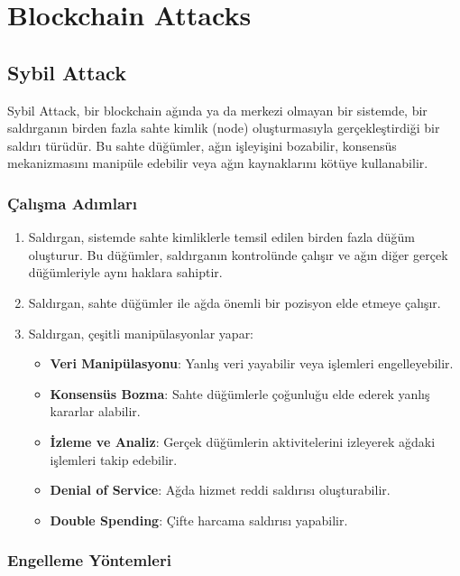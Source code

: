 \section{Blockchain Attacks}

\subsection{Sybil Attack}

Sybil Attack, bir blockchain ağında ya da merkezi olmayan bir sistemde, bir saldırganın birden fazla sahte kimlik (node) oluşturmasıyla gerçekleştirdiği bir saldırı türüdür. Bu sahte düğümler, ağın işleyişini bozabilir, konsensüs mekanizmasını manipüle edebilir veya ağın kaynaklarını kötüye kullanabilir.

\subsubsection{Çalışma Adımları}

\begin{enumerate}
    \item Saldırgan, sistemde sahte kimliklerle temsil edilen birden fazla düğüm oluşturur. Bu düğümler, saldırganın kontrolünde çalışır ve ağın diğer gerçek düğümleriyle aynı haklara sahiptir.
    \item Saldırgan, sahte düğümler ile ağda önemli bir pozisyon elde etmeye çalışır.
    \item Saldırgan, çeşitli manipülasyonlar yapar:
    \begin{itemize}
        \item \textbf{Veri Manipülasyonu}: Yanlış veri yayabilir veya işlemleri engelleyebilir.
        \item \textbf{Konsensüs Bozma}: Sahte düğümlerle çoğunluğu elde ederek yanlış kararlar alabilir.
        \item \textbf{İzleme ve Analiz}: Gerçek düğümlerin aktivitelerini izleyerek ağdaki işlemleri takip edebilir.
        \item \textbf{Denial of Service}: Ağda hizmet reddi saldırısı oluşturabilir.
        \item \textbf{Double Spending}: Çifte harcama saldırısı yapabilir.
    \end{itemize}
\end{enumerate}

\subsubsection{Engelleme Yöntemleri}

